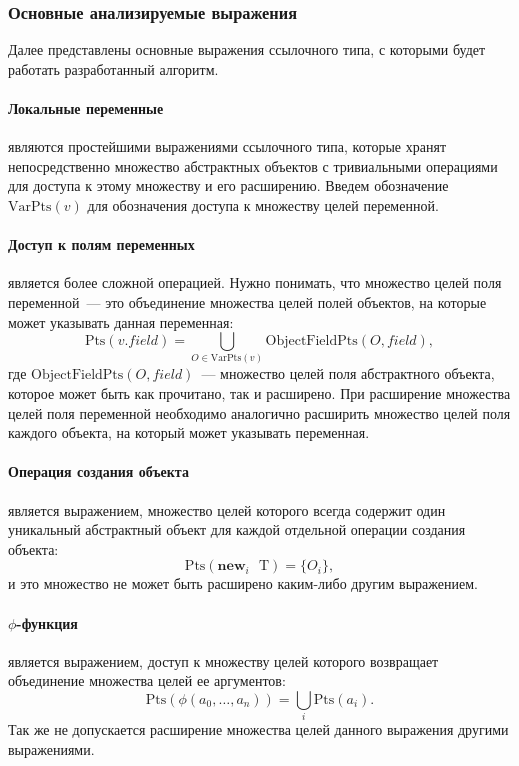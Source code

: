 \documentclass[14pt,titlepage]{extarticle}
\newcommand{\NEWi}[1]{\textbf{new}_{#1}\textbf{ }}
\newcommand{\Pts}[1]{\textrm{Pts}(#1)}
\newcommand{\VPts}[1]{\textrm{VarPts}(#1)}
\newcommand{\OFPts}[2]{\textrm{ObjectFieldPts}(#1, #2)}
\let\oldphi\phi
\renewcommand{\phi}{\ensuremath{\oldphi}}
\begin{document}
      \subsubsection{Основные анализируемые выражения}
        \label{section:pts_providers}

        Далее представлены основные выражения ссылочного типа, с которыми будет
        работать разработанный алгоритм.

        \paragraph{Локальные переменные} являются простейшими выражениями
        ссылочного типа, которые хранят непосредственно множество абстрактных
        объектов с тривиальными операциями для доступа к этому множеству и его
        расширению. Введем обозначение $\VPts{v}$ для обозначения доступа к
        множеству целей переменной.

        \paragraph{Доступ к полям переменных} является более сложной операцией.
        Нужно понимать, что множество целей поля переменной~--- это объединение
        множества целей полей объектов, на которые может указывать данная
        переменная:
        \[\Pts{v.field} = \bigcup\limits_{O \in \VPts{v}} \OFPts{O}{field},\]
        где $\OFPts{O}{field}$~--- множество целей поля абстрактного объекта,
        которое может быть как прочитано, так и расширено.
        При расширение множества целей поля переменной необходимо аналогично
        расширить множество целей поля каждого объекта, на который может
        указывать переменная.

        \paragraph{Операция создания объекта} является выражением, множество
        целей которого всегда содержит один уникальный абстрактный объект для
        каждой отдельной операции создания объекта:
        \[\Pts{\NEWi{i} \textrm{T}} = \{O_i\},\]
        и это множество не может быть расширено каким-либо другим выражением.

        \paragraph{\phi-функция} является выражением, доступ к множеству целей
        которого возвращает объединение множества целей ее аргументов:
        \[\Pts{\phi(a_0, \ldots, a_n)} = \bigcup\limits_{i} \Pts{a_i}.\]
        Так же не допускается расширение множества целей данного выражения
        другими выражениями.
\end{document}
